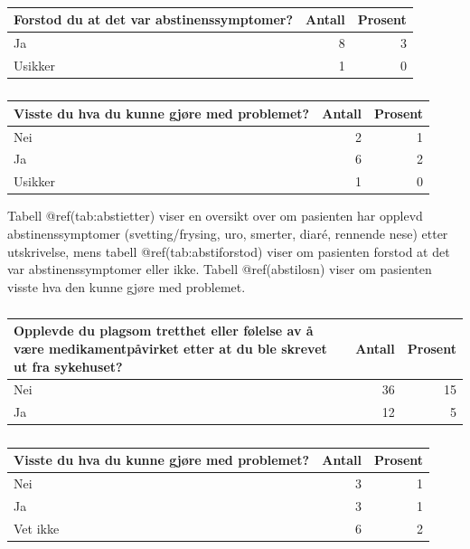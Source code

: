 \documentclass[
]{article}
\begin{document}
\begin{table}

\caption{\label{tab:abstiforstod}}
\centering
\begin{tabular}[t]{l|r|r}
\hline
Forstod du at det var abstinenssymptomer? & Antall  & Prosent\\
\hline
Ja & 8 & 3\\
\hline
Usikker & 1 & 0\\
\hline
\end{tabular}
\end{table}

\begin{table}

\caption{\label{tab:abstilosn}}
\centering
\begin{tabular}[t]{l|r|r}
\hline
Visste du hva du kunne gjøre med problemet? & Antall  & Prosent\\
\hline
Nei & 2 & 1\\
\hline
Ja & 6 & 2\\
\hline
Usikker & 1 & 0\\
\hline
\end{tabular}
\end{table}

Tabell @ref(tab:abstietter) viser en oversikt over om pasienten har
opplevd abstinenssymptomer (svetting/frysing, uro, smerter, diaré,
rennende nese) etter utskrivelse, mens tabell @ref(tab:abstiforstod)
viser om pasienten forstod at det var abstinenssymptomer eller ikke.
Tabell @ref(abstilosn) viser om pasienten visste hva den kunne gjøre med
problemet.

\begin{table}

\caption{\label{tab:tretth}}
\centering
\begin{tabular}[t]{l|r|r}
\hline
Opplevde du plagsom tretthet eller følelse av å være medikamentpåvirket etter at du ble skrevet ut fra sykehuset? & Antall  & Prosent\\
\hline
Nei & 36 & 15\\
\hline
Ja & 12 & 5\\
\hline
\end{tabular}
\end{table}

\begin{table}

\caption{\label{tab:trettvisste}}
\centering
\begin{tabular}[t]{l|r|r}
\hline
Visste du hva du kunne gjøre med problemet? & Antall  & Prosent\\
\hline
Nei & 3 & 1\\
\hline
Ja & 3 & 1\\
\hline
Vet ikke & 6 & 2\\
\hline
\end{tabular}
\end{table}
\end{document}
